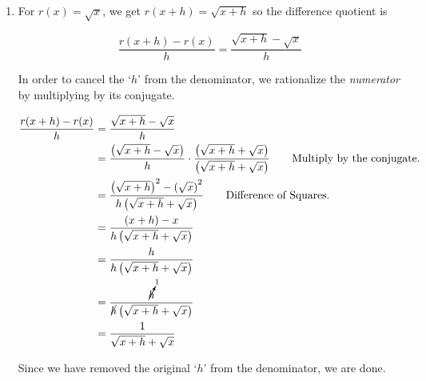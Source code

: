 {\begin{enumerate}
which yields 

\begin{longtable}{rclr}  

$\dfrac{g(x+h)-g(x)}{h}$ & = & $\dfrac{\dfrac{3}{2x+2h+1}-\dfrac{3}{2x+1}}{h}$ & \\ [3pt]
& = &  $\dfrac{\dfrac{3}{2x+2h+1}-\dfrac{3}{2x+1}}{h} \cdot \dfrac{(2x+2h+1)(2x+1)}{(2x+2h+1)(2x+1)}$ & \\ [3pt]
& = &  $\dfrac{3(2x+1)-3(2x+2h+1)}{h(2x+2h+1)(2x+1)}$  & \\ [3pt]
& = &  $\dfrac{6x+3-6x-6h-3}{h(2x+2h+1)(2x+1)}$  & \\ [3pt]
& = &  $\dfrac{-6h}{h(2x+2h+1)(2x+1)}$  & \\ [3pt]
& = &  $\dfrac{-6\cancel{h}}{\cancel{h}(2x+2h+1)(2x+1)}$  & \\ [3pt]
& = &  $\dfrac{-6}{(2x+2h+1)(2x+1)}$.  & \\ 

\end{longtable}

Since we have managed to cancel the original `$h$' from the denominator, we are done.

\item  For $r(x) = \sqrt{x}$, we get $r(x+h) = \sqrt{x+h}$ so the difference quotient is 

\[ \dfrac{r(x+h) - r(x)}{h} = \dfrac{\sqrt{x+h} - \sqrt{x}}{h} \]

In order to cancel the `$h$' from the denominator, we rationalize the \textit{numerator} by multiplying by its conjugate.

\begin{align*}
\dfrac{r(x+h) - r(x)}{h} & = \dfrac{\sqrt{x+h} - \sqrt{x}}{h}  \\ 											 & =  \dfrac{\left(\sqrt{x+h} - \sqrt{x}\right)}{h} \cdot \dfrac{\left(\sqrt{x+h} + \sqrt{x}\right)}{\left(\sqrt{x+h} + \sqrt{x}\right)}  \tag*{Multiply by the conjugate.} \\
	 & =   \dfrac{\left(\sqrt{x+h}\right)^2 - \left(\sqrt{x}\right)^2}{h\left(\sqrt{x+h} + \sqrt{x}\right)}  \tag*{Difference of Squares.}\\					& =   \dfrac{(x+h) - x}{h\left(\sqrt{x+h} + \sqrt{x}\right)}  \\ 				    & =   \dfrac{h}{h\left(\sqrt{x+h} + \sqrt{x}\right)}  \\						    & =   \dfrac{\cancelto{1}{h}}{\cancel{h}\left(\sqrt{x+h} + \sqrt{x}\right)} \\ 
	 & =   \dfrac{1}{\sqrt{x+h} + \sqrt{x}}
\end{align*}

Since we have removed the original `$h$' from the denominator, we are done.
\end{enumerate}
}

